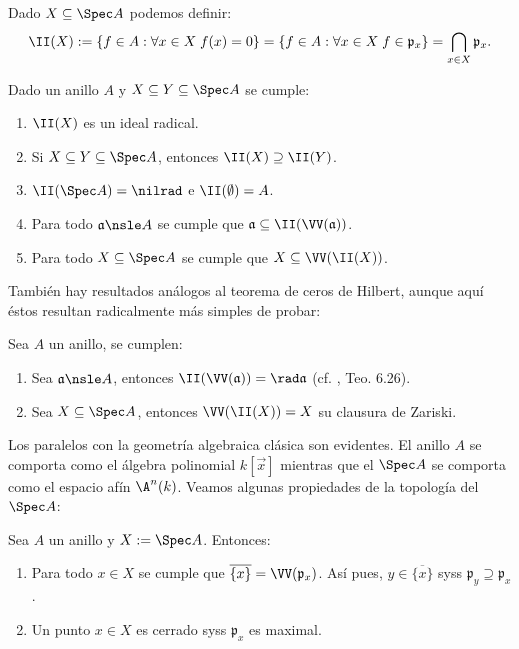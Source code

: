 \begin{mydef}
	Dado $X \subseteq \Spec A$ podemos definir:
	$$ \II(X) := \{ f \in A : \forall x \in X \; f(x) = 0 \} = \{ f \in A : \forall x \in X \; f \in \mathfrak{p}_x \} = \bigcap_{x\in X} \mathfrak{p}_x. $$
\end{mydef}

\begin{prop}
	Dado un anillo $A$ y $X \subseteq Y \subseteq \Spec A$ se cumple:
	\begin{enumerate}
		\item $\II(X)$ es un ideal radical.
		\item Si $X \subseteq Y \subseteq \Spec A$, entonces $\II(X) \supseteq \II(Y)$.
		\item $\II(\Spec A) = \nilrad$ e $\II(\emptyset) = A$.
		\item Para todo $\mathfrak{a} \nsle A$ se cumple que $\mathfrak{a} \subseteq \II( \VV(\mathfrak{a}) )$.
		\item Para todo $X \subseteq \Spec A$ se cumple que $X \subseteq \VV( \II(X) )$.
	\end{enumerate}
\end{prop}

También hay resultados análogos al teorema de ceros de Hilbert, aunque aquí éstos resultan radicalmente más simples de probar:
\begin{thm}\label{thm:ring_nullstellensatz}
	Sea $A$ un anillo, se cumplen:
	\begin{enumerate}
		\item Sea $\mathfrak{a} \nsle A$, entonces $\II( \VV(\mathfrak{a}) ) = \rad\mathfrak{a}$ (cf. \cite{Alg}, Teo. 6.26).
		\item Sea $X \subseteq \Spec A$, entonces $\VV( \II(X) ) = X$ su clausura de Zariski.
	\end{enumerate}
\end{thm}
Los paralelos con la geometría algebraica clásica son evidentes.
El anillo $A$ se comporta como el álgebra polinomial $k[\vec x]$ mientras que el $\Spec A$ se comporta como el espacio afín $\A^n(k)$.
Veamos algunas propiedades de la topología del $\Spec A$:
\begin{cor}\label{thm:spec_closure}
	Sea $A$ un anillo y $X := \Spec A$. Entonces:
	\begin{enumerate}
		\item Para todo $x \in X$ se cumple que $\overline{\{ x \}} = \VV(\mathfrak{p}_x)$.
			Así pues, $y \in \overline{\{ x \}}$ syss $\mathfrak{p}_y \supseteq \mathfrak{p}_x$.
		\item Un punto $x \in X$ es cerrado syss $\mathfrak{p}_x$ es maximal.
	\end{enumerate}
\end{cor}

